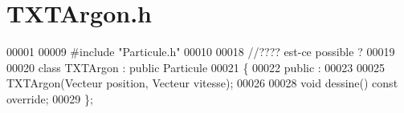 \section{T\+X\+T\+Argon.\+h}
\label{_t_x_t_argon_8h_source}

\begin{DoxyCode}
00001 
00009 \textcolor{preprocessor}{#include "Particule.h"}
00010 
00018 \textcolor{comment}{//???? est-ce possible ?}
00019 
00020 \textcolor{keyword}{class }TXTArgon : \textcolor{keyword}{public} Particule
00021 \{
00022     \textcolor{keyword}{public} :
00023     
00025     TXTArgon(Vecteur position, Vecteur vitesse);
00026     
00028     \textcolor{keywordtype}{void} dessine() \textcolor{keyword}{const override};
00029 \};
\end{DoxyCode}
